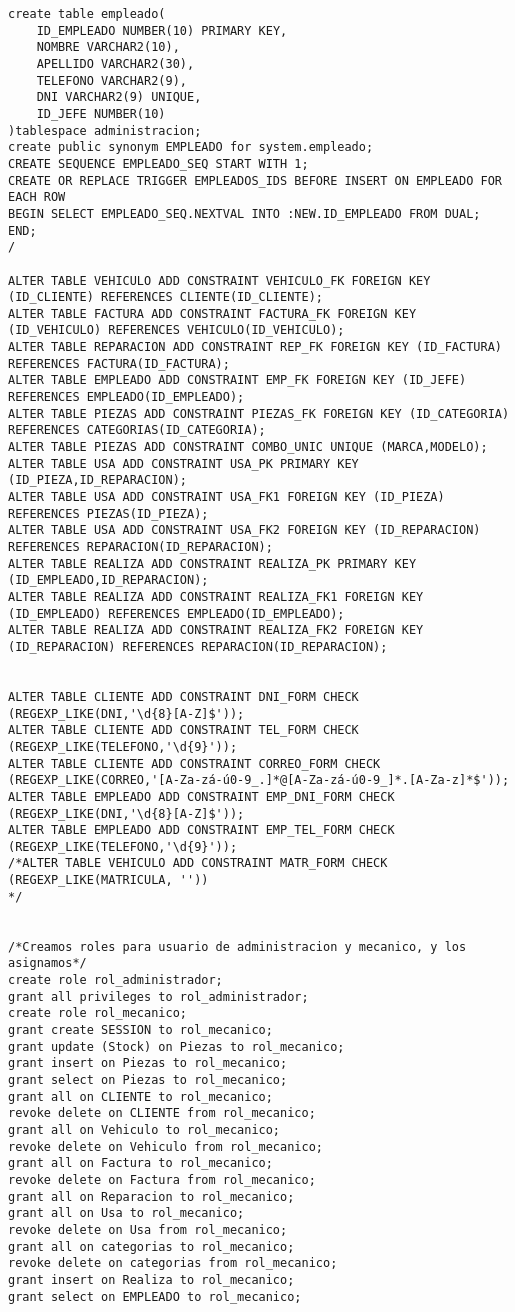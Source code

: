 \begin{lstlisting}
create table empleado(
    ID_EMPLEADO NUMBER(10) PRIMARY KEY,
    NOMBRE VARCHAR2(10),
    APELLIDO VARCHAR2(30),
    TELEFONO VARCHAR2(9),
    DNI VARCHAR2(9) UNIQUE,
    ID_JEFE NUMBER(10)
)tablespace administracion;
create public synonym EMPLEADO for system.empleado;
CREATE SEQUENCE EMPLEADO_SEQ START WITH 1;
CREATE OR REPLACE TRIGGER EMPLEADOS_IDS BEFORE INSERT ON EMPLEADO FOR EACH ROW
BEGIN SELECT EMPLEADO_SEQ.NEXTVAL INTO :NEW.ID_EMPLEADO FROM DUAL;
END;
/

ALTER TABLE VEHICULO ADD CONSTRAINT VEHICULO_FK FOREIGN KEY (ID_CLIENTE) REFERENCES CLIENTE(ID_CLIENTE);
ALTER TABLE FACTURA ADD CONSTRAINT FACTURA_FK FOREIGN KEY (ID_VEHICULO) REFERENCES VEHICULO(ID_VEHICULO);
ALTER TABLE REPARACION ADD CONSTRAINT REP_FK FOREIGN KEY (ID_FACTURA) REFERENCES FACTURA(ID_FACTURA);
ALTER TABLE EMPLEADO ADD CONSTRAINT EMP_FK FOREIGN KEY (ID_JEFE) REFERENCES EMPLEADO(ID_EMPLEADO);
ALTER TABLE PIEZAS ADD CONSTRAINT PIEZAS_FK FOREIGN KEY (ID_CATEGORIA) REFERENCES CATEGORIAS(ID_CATEGORIA);
ALTER TABLE PIEZAS ADD CONSTRAINT COMBO_UNIC UNIQUE (MARCA,MODELO);
ALTER TABLE USA ADD CONSTRAINT USA_PK PRIMARY KEY (ID_PIEZA,ID_REPARACION);
ALTER TABLE USA ADD CONSTRAINT USA_FK1 FOREIGN KEY (ID_PIEZA) REFERENCES PIEZAS(ID_PIEZA);
ALTER TABLE USA ADD CONSTRAINT USA_FK2 FOREIGN KEY (ID_REPARACION) REFERENCES REPARACION(ID_REPARACION);
ALTER TABLE REALIZA ADD CONSTRAINT REALIZA_PK PRIMARY KEY (ID_EMPLEADO,ID_REPARACION);
ALTER TABLE REALIZA ADD CONSTRAINT REALIZA_FK1 FOREIGN KEY (ID_EMPLEADO) REFERENCES EMPLEADO(ID_EMPLEADO);
ALTER TABLE REALIZA ADD CONSTRAINT REALIZA_FK2 FOREIGN KEY (ID_REPARACION) REFERENCES REPARACION(ID_REPARACION);


ALTER TABLE CLIENTE ADD CONSTRAINT DNI_FORM CHECK (REGEXP_LIKE(DNI,'\d{8}[A-Z]$'));
ALTER TABLE CLIENTE ADD CONSTRAINT TEL_FORM CHECK (REGEXP_LIKE(TELEFONO,'\d{9}'));
ALTER TABLE CLIENTE ADD CONSTRAINT CORREO_FORM CHECK (REGEXP_LIKE(CORREO,'[A-Za-zá-ú0-9_.]*@[A-Za-zá-ú0-9_]*.[A-Za-z]*$'));
ALTER TABLE EMPLEADO ADD CONSTRAINT EMP_DNI_FORM CHECK (REGEXP_LIKE(DNI,'\d{8}[A-Z]$'));
ALTER TABLE EMPLEADO ADD CONSTRAINT EMP_TEL_FORM CHECK (REGEXP_LIKE(TELEFONO,'\d{9}'));
/*ALTER TABLE VEHICULO ADD CONSTRAINT MATR_FORM CHECK (REGEXP_LIKE(MATRICULA, ''))
*/


/*Creamos roles para usuario de administracion y mecanico, y los asignamos*/
create role rol_administrador;
grant all privileges to rol_administrador;
create role rol_mecanico;
grant create SESSION to rol_mecanico;
grant update (Stock) on Piezas to rol_mecanico;
grant insert on Piezas to rol_mecanico;
grant select on Piezas to rol_mecanico;
grant all on CLIENTE to rol_mecanico;
revoke delete on CLIENTE from rol_mecanico;
grant all on Vehiculo to rol_mecanico;
revoke delete on Vehiculo from rol_mecanico;
grant all on Factura to rol_mecanico;
revoke delete on Factura from rol_mecanico;
grant all on Reparacion to rol_mecanico;
grant all on Usa to rol_mecanico;
revoke delete on Usa from rol_mecanico;
grant all on categorias to rol_mecanico;
revoke delete on categorias from rol_mecanico;
grant insert on Realiza to rol_mecanico;
grant select on EMPLEADO to rol_mecanico;


\end{lstlisting}
